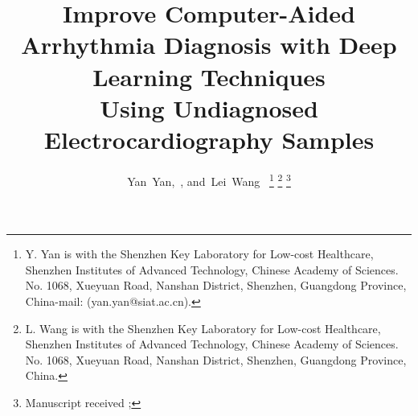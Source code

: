 \documentclass[journal]{IEEEtran}
\begin{document}
%
\title{Improve Computer-Aided Arrhythmia Diagnosis with Deep Learning Techniques \\ Using Undiagnosed Electrocardiography Samples}
%
%

\author{Yan~Yan,~,
        and~Lei~Wang~%
\thanks{Y. Yan is with the Shenzhen Key Laboratory for Low-cost Healthcare, Shenzhen Institutes of Advanced Technology, Chinese Academy of Sciences. No. 1068, Xueyuan Road, Nanshan District,
Shenzhen, Guangdong Province, China-mail: (yan.yan@siat.ac.cn).}%
\thanks{L. Wang is with the Shenzhen Key Laboratory for Low-cost Healthcare, Shenzhen Institutes of Advanced Technology, Chinese Academy of Sciences.
No. 1068, Xueyuan Road, Nanshan District,
Shenzhen, Guangdong Province, China.}%
\thanks{Manuscript received ; }}

% 
%
\end{document}
